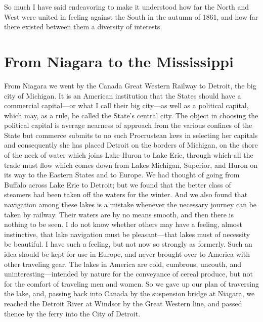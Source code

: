 So much I have said endeavoring to make it understood how far the
North and West were united in feeling against the South in the
autumn of 1861, and how far there existed between them a diversity
of interests.



\chapter{From Niagara to the Mississippi}


From Niagara we went by the Canada Great Western Railway to
Detroit, the big city of Michigan.  It is an American institution
that the States should have a commercial capital---or what I call
their big city---as well as a political capital, which may, as a
rule, be called the State's central city.  The object in choosing
the political capital is average nearness of approach from the
various confines of the State but commerce submits to no such
Procrustean laws in selecting her capitals and consequently she has
placed Detroit on the borders of Michigan, on the shore of the neck
of water which joins Lake Huron to Lake Erie, through which all the
trade must flow which comes down from Lakes Michigan, Superior, and
Huron on its way to the Eastern States and to Europe.  We had
thought of going from Buffalo across Lake Erie to Detroit; but we
found that the better class of steamers had been taken off the
waters for the winter.  And we also found that navigation among
these lakes is a mistake whenever the necessary journey can be
taken by railway.  Their waters are by no means smooth, and then
there is nothing to be seen.  I do not know whether others may have
a feeling, almost instinctive, that lake navigation must be
pleasant---that lakes must of necessity be beautiful.  I have such a
feeling, but not now so strongly as formerly.  Such an idea should
be kept for use in Europe, and never brought over to America with
other traveling gear.  The lakes in America are cold, cumbrous,
uncouth, and uninteresting---intended by nature for the conveyance
of cereal produce, but not for the comfort of traveling men and
women.  So we gave up our plan of traversing the lake, and, passing
back into Canada by the suspension bridge at Niagara, we reached
the Detroit River at Windsor by the Great Western line, and passed
thence by the ferry into the City of Detroit.

